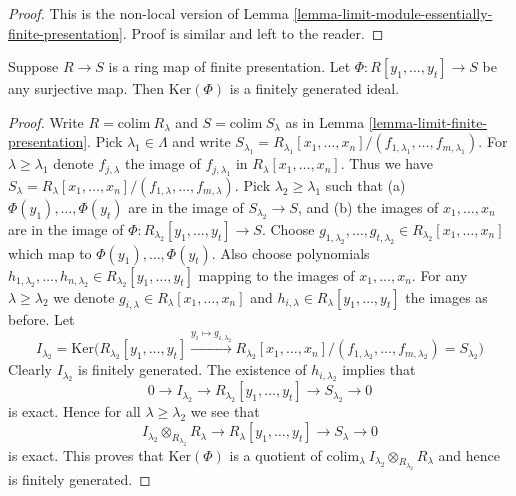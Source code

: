 \begin{proof}
This is the non-local version of
Lemma \ref{lemma-limit-module-essentially-finite-presentation}.
Proof is similar and left to the reader.
\end{proof}

\begin{lemma}
\label{lemma-finite-presentation-independent}
Suppose $R \to S$ is a ring map of finite presentation.
Let $\Phi : R[y_1,\ldots, y_t] \to S$ be any surjective map.
Then $\text{Ker}(\Phi)$ is a finitely generated ideal.
\end{lemma}

\begin{proof}
Write $R = \text{colim}\ R_\lambda$ and $S = \text{colim}\ S_\lambda$
as in Lemma \ref{lemma-limit-finite-presentation}.
Pick $\lambda_1 \in \Lambda$ and write
$S_{\lambda_1} = R_{\lambda_1}[x_1,\ldots,x_n]/
(f_{1,\lambda_1},\ldots,f_{m,\lambda_1})$. For $\lambda \geq \lambda_1$
denote $f_{j, \lambda}$ the image of $f_{j, \lambda_1}$ in
$R_\lambda[x_1,\ldots,x_n]$. Thus we have
$S_{\lambda} = R_{\lambda}[x_1,\ldots,x_n]/
(f_{1,\lambda},\ldots,f_{m,\lambda})$. Pick $\lambda_2 \geq \lambda_1$
such that (a) $\Phi(y_1),\ldots,\Phi(y_t)$ are in the image of
$S_{\lambda_2} \to S$, and (b) the images of $x_1,\ldots,x_n$
are in the image of $\Phi : R_{\lambda_2}[y_1,\ldots,y_t] \to S$.
Choose $g_{1,\lambda_2},\ldots,g_{t, \lambda_2} \in 
R_{\lambda_2}[x_1,\ldots,x_n]$ which map to $\Phi(y_1),\ldots,\Phi(y_t)$.
Also choose polynomials
$h_{1,\lambda_2},\ldots, h_{n,\lambda_2} \in R_{\lambda_2}[y_1,\ldots,y_t]$
mapping to the images of $x_1,\ldots,x_n$.
For any $\lambda \geq \lambda_2$ we denote 
$g_{i, \lambda} \in R_{\lambda}[x_1,\ldots,x_n]$
and
$h_{i, \lambda} \in R_{\lambda}[y_1,\ldots,y_t]$
the images as before. Let
$$
I_{\lambda_2} = \text{Ker}\Big(
R_{\lambda_2}[y_1,\ldots,y_t]
\xrightarrow{y_i \mapsto g_{i, \lambda_2}}
R_{\lambda_2}[x_1,\ldots,x_n]/(f_{1,\lambda_2},\ldots,f_{m,\lambda_2})
= S_{\lambda_2}
\Big)
$$
Clearly $I_{\lambda_2}$ is finitely generated. The existence of
$h_{i, \lambda_2}$ implies that 
$$
0 \to I_{\lambda_2} \to R_{\lambda_2}[y_1,\ldots,y_t]
\to S_{\lambda_2} \to 0
$$
is exact. Hence for all $\lambda \geq \lambda_2$ we see
that
$$
I_{\lambda_2} \otimes_{R_{\lambda_2}} R_\lambda
\to 
R_{\lambda}[y_1,\ldots,y_t]
\to S_{\lambda} \to 0
$$
is exact. This proves that $\text{Ker}(\Phi)$
is a quotient of
$\text{colim}_\lambda\ I_{\lambda_2} \otimes_{R_{\lambda_2}} R_\lambda$
and hence is finitely generated.
\end{proof}













